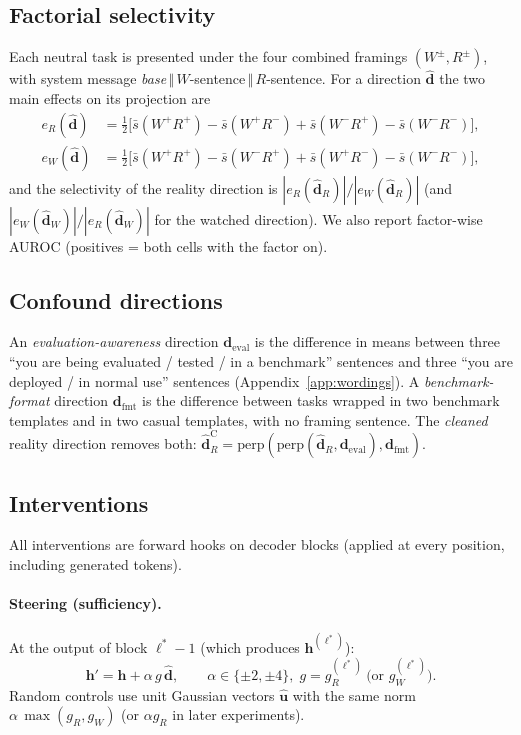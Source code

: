 \documentclass[10pt]{article}
\newcommand{\hR}{\hat{\bm{d}}_{R}}
\newcommand{\hW}{\hat{\bm{d}}_{W}}
\newcommand{\h}{\bm{h}}
\begin{document}
\subsection{Factorial selectivity}
Each neutral task is presented under the four combined framings $(W^{\pm},R^{\pm})$, with system message
\textit{base}\,$\Vert$\,$W$-sentence\,$\Vert$\,$R$-sentence. For a direction $\hat{\bm d}$ the two main effects on its projection are
\begin{align}
e_R(\hat{\bm d})&=\tfrac12\Big[\bar s(W^{+}R^{+})-\bar s(W^{+}R^{-})+\bar s(W^{-}R^{+})-\bar s(W^{-}R^{-})\Big],\\
e_W(\hat{\bm d})&=\tfrac12\Big[\bar s(W^{+}R^{+})-\bar s(W^{-}R^{+})+\bar s(W^{+}R^{-})-\bar s(W^{-}R^{-})\Big],
\end{align}
and the selectivity of the reality direction is $|e_R(\hR)|/|e_W(\hR)|$ (and $|e_W(\hW)|/|e_R(\hW)|$ for the watched direction).
We also report factor-wise AUROC (positives = both cells with the factor on).

\subsection{Confound directions}
An \emph{evaluation-awareness} direction $\bm d_{\mathrm{eval}}$ is the difference in means between three ``you are being evaluated /
tested / in a benchmark'' sentences and three ``you are deployed / in normal use'' sentences (Appendix~\ref{app:wordings}). A
\emph{benchmark-format} direction $\bm d_{\mathrm{fmt}}$ is the difference between tasks wrapped in two benchmark templates and in two
casual templates, with no framing sentence. The \emph{cleaned} reality direction removes both:
$\hR^{\mathrm{C}}=\mathrm{perp}(\mathrm{perp}(\hR,\bm d_{\mathrm{eval}}),\bm d_{\mathrm{fmt}})$.

\subsection{Interventions}
All interventions are forward hooks on decoder blocks (applied at every position, including generated tokens).
\paragraph{Steering (sufficiency).} At the output of block $\ell^{*}-1$ (which produces $\h^{(\ell^*)}$):
\begin{equation}
\h'=\h+\alpha\,g\,\hat{\bm d},\qquad \alpha\in\{\pm2,\pm4\},\; g=g_R^{(\ell^*)}\ \text{(or } g_W^{(\ell^*)}\text{)}.
\label{eq:steer}
\end{equation}
Random controls use unit Gaussian vectors $\hat{\bm u}$ with the same norm $\alpha\,\max(g_R,g_W)$ (or $\alpha g_R$ in later experiments).
\end{document}
